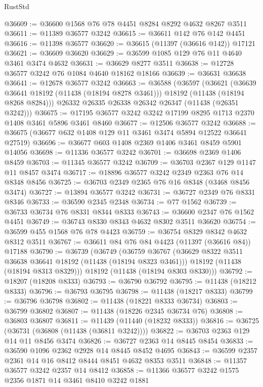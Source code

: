 \begin{lexlean}{RustStd}
\begin{coremodule}
@36609 := @36600 @1568 @76 @78 @4451 @8284 @8292 @4632 @8267 @3511
@36611 := @11389 @36577 @3242
@36615 := @36611 @142 @76 @142 @4451
@36616 := @11398 @36577
@36620 := @36615 (@11397 (@36616 @142)) @17121
@36621 := @36609 @36620
@36629 := @36599 @1085 @129 @76 @11 @4640 @3461 @3474 @4632
@36631 := @36629 @8277 @3511
@36638 := @12728 @36577 @3242 @76 @1084 @4640 @18162 @18166
@36639 := @36631 @36638
@36641 := @12678 @36577 @3242
@36663 := @36588
    (@36597
      (@36621
        (@36639 @36641 @18192 (@11438 (@18194 @8278 @3461)))
        @18192
        (@11438 (@18194 @8268 @8284)))
      @26332
      @26335
      @26338
      @26342
      @26347
      (@11438 (@26351 @3242)))
@36675 := @17195 @36577 @3242 @3242 @17199 @8295 @1713 @2370 @1408 @3461 @5896 @3461 @8460
@36677 := @12506 @36577 @3242
@36688 := @36675 (@36677 @632 @1408 @129 @11 @3461 @3474 @5894 @12522 @36641 @27519)
@36696 := @36677 @603 @1408 @2369 @1406 @3461 @8459 @5901 @14056
@36698 := @11336 @36577 @3242
@36701 := @36698 @2369 @1406 @8459
@36703 := @11345 @36577 @3242
@36709 := @36703 @2367 @129 @1147 @11 @8457 @3474
@36717 := @18896 @36577 @3242 @2349 @2363 @76 @14 @8348 @8456
@36725 := @36703 @2349 @2365 @76 @16 @8348 (@3468 @8456 @3474)
@36727 := @13894 @36577 @3242
@36731 := @36727 @2349 @76 @8331 @8346
@36733 := @36590 @2345 @2348
@36734 := @77 @1562
@36739 := @36733 @36734 @76 @8331 @8344 @8333
@36743 := @36600 @2347 @76 @1562 @4451
@36749 := @36743 @8330 @8343 @4632 @8302 @3511 @36620
@36754 := @36599 @455 @1568 @76 @78 @4423
@36759 := @36754 @8329 @8342 @4632 @8312 @3511
@36767 := @36611 @84 @76 @84 @4423 (@11397 (@36616 @84)) @17188
@36790 := @36739
    (@36749
      (@36759
        @36767
        (@36629 @8322 @3511 @36638 @36641 @18192 (@11438 (@18194 @8323 @3461)))
        @18192
        (@11438 (@18194 @8313 @8329)))
      @18192
      (@11438 (@18194 @8303 @8330)))
@36792 := @18207 (@18208 @8333)
@36793 := @36790 @36792
@36795 := @11438 (@18212 @8333)
@36796 := @36793 @36795
@36798 := @11438 (@18217 @8333)
@36799 := @36796 @36798
@36802 := @11438 (@18221 @8333 @36734)
@36803 := @36799 @36802
@36807 := @11438 (@18226 @2345 @36734 @76)
@36808 := @36803 @36807
@36811 := @11439 (@11440 (@18232 @8333))
@36816 := @36725 (@36731 (@36808 (@11438 (@36811 @3242))))
@36822 := @36703 @2363 @129 @14 @11 @8456 @3474
@36826 := @36727 @2363 @14 @8445 @8454
@36833 := @36590 @1096 @2362 @2928 @14 @8445 @8452 @4695
@36843 := @36599 @2357 @2361 @14 @16 @8412 @8444 @8451 @4632 @8353 @3511
@36848 := @11357 @36577 @3242 @2357 @14 @8412
@36858 := @11366 @36577 @3242 @1575 @2356 @1871 @14 @3461 @8410 @3242 @1881

\end{coremodule}
\end{lexlean}
